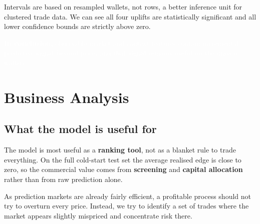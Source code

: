 \documentclass[11pt,a4paper]{article}
\begin{document}
Intervals are based on resampled wallets, not rows, a better inference unit for clustered trade data.
We can see all four uplifts are statistically significant and all lower confidence bounds are strictly above zero.

\vspace{1.25em}
\begin{mdframed}[linewidth=0.6pt, backgroundcolor=ucdblue]
\vspace{0.5em}
\textcolor{white}{\textbf{In conclusion,} observable market and context features contain
incremental predictive signal beyond price, and that signal remains useful on the
unseen wallets}
\vspace{0.5em}
\end{mdframed}

\newpage

\section{Business Analysis}
\label{sec:business}

\subsection{What the model is useful for}

The model is most useful as a \textbf{ranking tool}, not as a blanket rule to trade everything. On the full cold-start test set the average realised edge is close to zero, so the commercial value comes from \textbf{screening} and \textbf{capital allocation} rather than from raw prediction alone.

As prediction markets are already fairly efficient, a profitable process should not try to overturn every price. Instead, we try to identify a set of trades where the market appears slightly mispriced and concentrate risk there.
\end{document}
